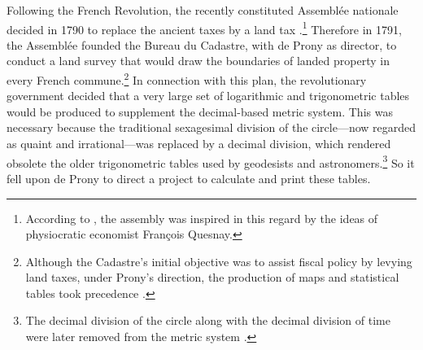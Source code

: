 \documentclass[version=last,draft=false,paper=A4,portrait,twoside=true,twocolumn=false,headinclude=false,footinclude=false,mpinclude=true,fontsize=12,BCOR=20mm,DIV=calc,pagesize=auto,open=right,chapterprefix=true,numbers=autoendperiod,headsepline=false,headings=twolinechapter,parskip=false]{scrbook}
\begin{document}
Following the French Revolution, the recently constituted Assemblée
nationale decided in 1790 to replace the ancient taxes by a land tax
\autocite[p. 6]{peaucelle2012a}.\footnote{According to \textcite{peaucelle2012a}, the assembly was inspired in
this regard by the ideas of physiocratic economist François Quesnay.} Therefore in 1791, the Assemblée
founded the Bureau du Cadastre, with de Prony as director, to conduct a
land survey that would draw the boundaries of landed property in every
French commune.\footnote{Although the Cadastre's initial objective was to assist fiscal
policy by levying land taxes, under Prony's direction, the production of
maps and statistical tables took precedence \autocite[p.
76]{peaucelle2012a}.} In connection with this plan, the revolutionary
government decided that a very large set of logarithmic and trigonometric
tables would be produced to supplement the decimal-based metric system.
This was necessary because the traditional sexagesimal division of the
circle---now regarded as quaint and irrational---was replaced by a decimal
division, which rendered obsolete the older trigonometric tables used by
geodesists and astronomers.\footnote{The decimal division of the circle along with the decimal division
of time were later removed from the metric system \autocite[p.
184]{daston1994}.} So it fell upon de Prony to direct a
project to calculate and print these tables.
\end{document}
